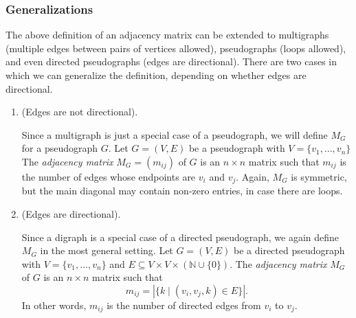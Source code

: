 \documentclass[12pt]{article}
\begin{document}
\subsubsection*{Generalizations}

The above definition of an adjacency matrix can be extended to multigraphs (multiple edges between pairs of vertices allowed), pseudographs (loops allowed), and even directed pseudographs (edges are directional).  There are two cases in which we can generalize the definition, depending on whether edges are directional.

\begin{enumerate}
\item (Edges are not directional).  

Since a multigraph is just a special case of a pseudograph, we will define $M_G$ for a pseudograph $G$.  Let $G=(V,E)$ be a pseudograph with $V=\lbrace v_1,\ldots,v_n\rbrace$  The \emph{adjacency matrix} $M_G=(m_{ij})$ of $G$ is an $n\times n$ matrix such that $m_{ij}$ is the number of edges whose endpoints are $v_i$ and $v_j$.  Again, $M_G$ is symmetric, but the main diagonal may contain non-zero entries, in case there are loops.

\item (Edges are directional).  

Since a digraph is a special case of a directed pseudograph, we again define $M_G$ in the most general setting.  Let $G=(V,E)$ be a directed pseudograph with $V=\lbrace v_1,\ldots,v_n\rbrace$ and $E\subseteq V\times V\times (\mathbb{N}\cup \lbrace 0\rbrace)$.  The \emph{adjacency matrix} $M_G$ of $G$ is an $n\times n$ matrix such that $$m_{ij}=|\lbrace k\mid (v_i,v_j,k)\in E\rbrace|.$$  In other words, $m_{ij}$ is the number of directed edges from $v_i$ to $v_j$.

\end{enumerate}
\end{document}
